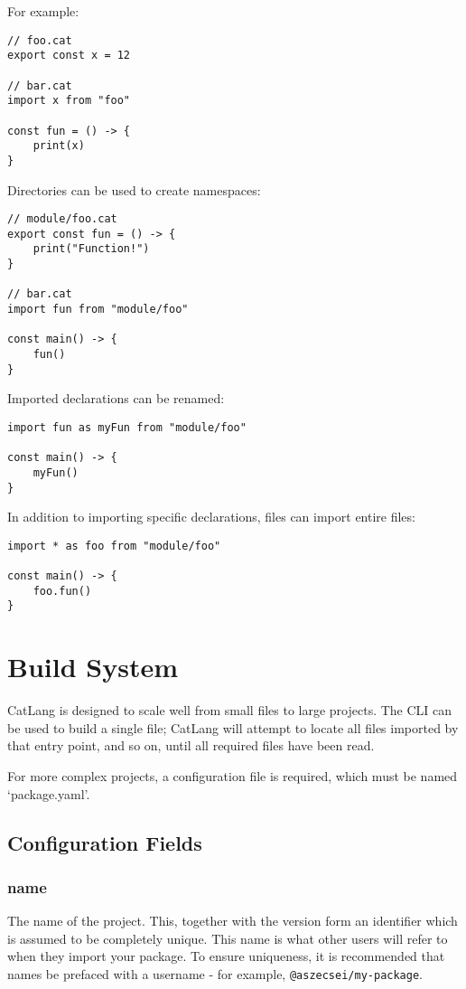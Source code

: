 \documentclass[12pt]{article}
\begin{document}
For example:

\begin{lstlisting}
// foo.cat
export const x = 12

// bar.cat
import x from "foo"

const fun = () -> {
	print(x)
}
\end{lstlisting}

Directories can be used to create namespaces:

\begin{lstlisting}
// module/foo.cat
export const fun = () -> {
	print("Function!")
}

// bar.cat
import fun from "module/foo"

const main() -> {
	fun()
}
\end{lstlisting}

Imported declarations can be renamed:

\begin{lstlisting}
import fun as myFun from "module/foo"

const main() -> {
	myFun()
}
\end{lstlisting}

In addition to importing specific declarations, files can import entire files:

\begin{lstlisting}
import * as foo from "module/foo"

const main() -> {
	foo.fun()
}
\end{lstlisting}

\section{Build System}

\lstset{
	language=yaml,
	basicstyle=\ttfamily,
	breaklines=true,
}

CatLang is designed to scale well from small files to large projects. The CLI can be used to build a single file; CatLang will attempt to locate all files imported by that entry point, and so on, until all required files have been read.

For more complex projects, a configuration file is required, which must be named `package.yaml'.
\subsection{Configuration Fields}
\subsubsection{name}
The name of the project. This, together with the version form an identifier which is assumed to be completely unique. This name is what other users will refer to when they import your package. To ensure uniqueness, it is recommended that names be prefaced with a username - for example, \texttt{@aszecsei/my-package}.
\end{document}
